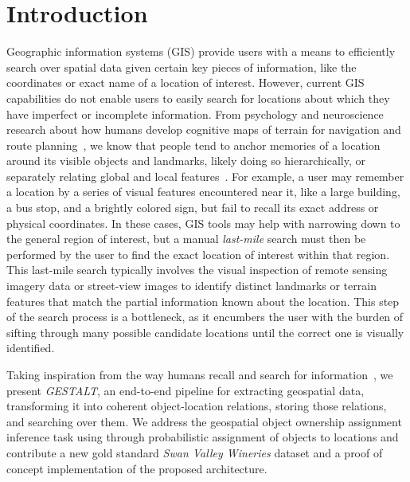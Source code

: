 \section{Introduction}
\label{section:introduction}
Geographic information systems (GIS) provide users with a means to efficiently search over spatial data given certain key pieces of information, like the coordinates or exact name of a location of interest. However, current GIS capabilities do not enable users to easily search for locations about which they have imperfect or incomplete information. From psychology and neuroscience research about how humans develop cognitive maps of terrain for navigation and route planning~\cite{Weisberg2016, Miller2013, Keatley2021, ??}, we know that people tend to anchor memories of a location around its visible objects and landmarks, likely doing so hierarchically, or separately relating global and local features~\cite{Weisberg2016}. For example, a user may remember a location by a series of visual features encountered near it, like a large building, a bus stop, and a brightly colored sign, but fail to recall its exact address or physical coordinates. In these cases, GIS tools may help with narrowing down to the general region of interest, but a manual \emph{last-mile} search must then be performed by the user to find the exact location of interest within that region. This last-mile search typically involves the visual inspection of remote sensing imagery data or street-view images to identify distinct landmarks or terrain features that match the partial information known about the location. This step of the search process is a bottleneck, as it encumbers the user with the burden of sifting through many possible candidate locations until the correct one is visually identified. 

Taking inspiration from the way humans recall and search for information~\cite{Helbing2020, Oliveira2016, Weisberg2016, ?}, we present \emph{GESTALT}, an end-to-end pipeline for extracting geospatial data, transforming it into coherent object-location relations, storing those relations, and searching over them. We address the geospatial object ownership assignment inference task using through probabilistic assignment of objects to locations and contribute a new gold standard \textit{Swan Valley Wineries} dataset and a proof of concept implementation of the proposed architecture.  %

